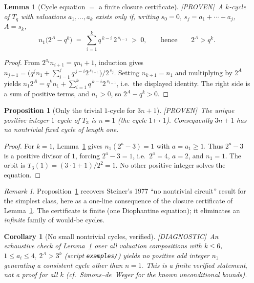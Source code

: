 \documentclass[11pt]{article}
\theoremstyle{definition}
\theoremstyle{plain}
\newtheorem{lemma}{Lemma}
\newtheorem{proposition}{Proposition}
\newtheorem{corollary}{Corollary}
\theoremstyle{remark}
\newtheorem*{remark}{Remark}
\newcommand{\PROVEN}{\textcolor{green!45!black}{\textsf{[PROVEN]}}}
\newcommand{\DIAG}{\textcolor{blue!55!black}{\textsf{[DIAGNOSTIC]}}}
\begin{document}
\begin{lemma}[Cycle equation $=$ a finite closure certificate]\label{lem:cyc}
\PROVEN\ A $k$-cycle of $T_q$ with valuations $a_1,\dots,a_k$ exists only if, writing
$s_0=0$, $s_j=a_1+\cdots+a_j$, $A=s_k$,
\[
n_1\big(2^{A}-q^{k}\big)\;=\;\sum_{i=1}^{k} q^{\,k-i}\,2^{\,s_{i-1}}\;>\;0,
\qquad\text{hence}\qquad 2^{A}>q^{k}.
\]
\end{lemma}
\begin{proof}
From $2^{a_i}n_{i+1}=qn_i+1$, induction gives
$n_{j+1}=\big(q^{j}n_1+\sum_{i=1}^{j}q^{\,j-i}2^{\,s_{i-1}}\big)/2^{\,s_j}$.
Setting $n_{k+1}=n_1$ and multiplying by $2^{A}$ yields
$n_1 2^{A}=q^{k}n_1+\sum_{i=1}^{k}q^{\,k-i}2^{\,s_{i-1}}$, i.e.\ the displayed identity.
The right side is a sum of positive terms, and $n_1>0$, so $2^A-q^k>0$.
\end{proof}

\begin{proposition}[Only the trivial $1$-cycle for $3n{+}1$]\label{prop:onecycle}
\PROVEN\ The unique positive-integer $1$-cycle of $T_3$ is $n=1$ (the cycle
$1\mapsto1$). Consequently $3n{+}1$ has no nontrivial fixed cycle of length one.
\end{proposition}
\begin{proof}
For $k=1$, Lemma~\ref{lem:cyc} gives $n_1(2^{a}-3)=1$ with $a=a_1\ge1$. Thus $2^a-3$ is
a positive divisor of $1$, forcing $2^a-3=1$, i.e.\ $2^a=4$, $a=2$, and $n_1=1$. The
orbit is $T_3(1)=(3\cdot1+1)/2^2=1$. No other positive integer solves the equation.
\end{proof}

\begin{remark}
Proposition~\ref{prop:onecycle} recovers Steiner's 1977 ``no nontrivial circuit''
result for the simplest class, here as a one-line consequence of the closure
certificate of Lemma~\ref{lem:cyc}. The certificate is finite (one Diophantine
equation); it eliminates an \emph{infinite} family of would-be cycles.
\end{remark}

\begin{corollary}[No small nontrivial cycles, verified]\label{cor:small}
\DIAG\ An exhaustive check of Lemma~\ref{lem:cyc} over all valuation compositions with
$k\le6$, $1\le a_i\le4$, $2^A>3^k$ (script \texttt{examples/}) yields no positive
\emph{odd} integer $n_1$ generating a consistent cycle other than $n=1$. This is a
finite verified statement, not a proof for all $k$ (cf.\ Simons--de~Weger for the known
unconditional bounds).
\end{corollary}
\end{document}
